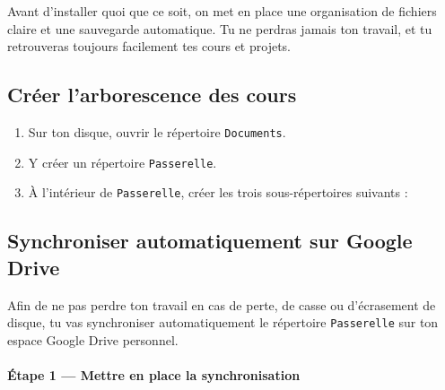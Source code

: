 \documentclass[a4paper,11pt]{article}
\begin{document}
Avant d'installer quoi que ce soit, on met en place une organisation de fichiers claire et une sauvegarde automatique. Tu ne perdras jamais ton travail, et tu retrouveras toujours facilement tes cours et projets.

\subsection{Créer l'arborescence des cours}

\begin{enumerate}
  \item Sur ton disque, ouvrir le répertoire \texttt{Documents}.
  \item Y créer un répertoire \texttt{Passerelle}.
  \item À l'intérieur de \texttt{Passerelle}, créer les trois sous-répertoires suivants :
\end{enumerate}

\begin{center}
\end{center}

\subsection{Synchroniser automatiquement sur Google Drive}

Afin de ne pas perdre ton travail en cas de perte, de casse ou d'écrasement de disque, tu vas synchroniser automatiquement le répertoire \texttt{Passerelle} sur ton espace Google Drive personnel.

\paragraph{Étape 1 --- Mettre en place la synchronisation}
\end{document}
